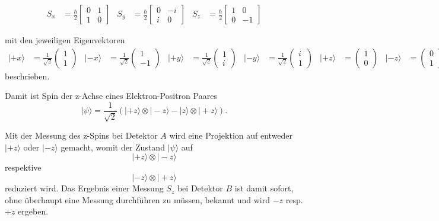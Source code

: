 \begin{refsection}
\begin{align*}
    S_x &= \frac{\hbar}{2} \begin{bmatrix}
    0 & 1 \\ 1 & 0
    \end{bmatrix}
    &
    S_y &= \frac{\hbar}{2} \begin{bmatrix}
    0 & -i \\ i & 0
    \end{bmatrix}
    &
    S_z &= \frac{\hbar}{2} \begin{bmatrix}
    1 & 0 \\ 0 & -1
    \end{bmatrix}
\end{align*}

mit den jeweiligen Eigenvektoren
\begin{align*}
    |{+}x\rangle &= \frac{1}{\sqrt{2}}\begin{pmatrix} 1\\1 \end{pmatrix} &
    |{-}x\rangle &= \frac{1}{\sqrt{2}}\begin{pmatrix} 1\\-1 \end{pmatrix} &
    |{+}y\rangle &= \frac{1}{\sqrt{2}}\begin{pmatrix} 1\\i \end{pmatrix} &
    |{-}y\rangle &= \frac{1}{\sqrt{2}}\begin{pmatrix} i\\1 \end{pmatrix} &
    |{+}z\rangle &= \begin{pmatrix} 1\\0 \end{pmatrix} &
    |{-}z\rangle &= \begin{pmatrix} 0\\1 \end{pmatrix} &
\end{align*}
beschrieben.

Damit ist Spin der z-Achse eines Elektron-Positron Paares
\begin{equation}
    |\psi\rangle = \frac{1}{\sqrt{2}} \left( 
        |{+}z\rangle \otimes |{-}z\rangle - |{}z\rangle \otimes |{+}z\rangle
     \right).
\end{equation}

Mit der Messung des z-Spins bei Detektor $A$ wird eine Projektion auf
entweder $|{+}z\rangle$ oder $|{-}z\rangle$ gemacht, womit der Zustand
$|\psi\rangle$ auf
\[
    |{+}z\rangle \otimes |{-}z\rangle
\]
respektive
\[
    |{-}z\rangle \otimes |{+}z\rangle
\]
reduziert wird.
Das Ergebnis einer Messung $S_z$ bei Detektor $B$ ist damit sofort, 
ohne \"uberhaupt eine Messung durchf\"uhren zu m\"ussen, bekannt und wird
$-z$ resp. $+z$ ergeben.


\end{refsection}
